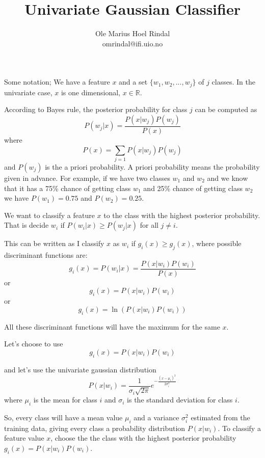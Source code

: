 \documentclass[11pt]{report}
\title{Univariate Gaussian Classifier}
\author{Ole Marius Hoel Rindal \\ omrindal@ifi.uio.no}
\begin{document}
\maketitle
Some notation; We have a feature $x$ and a set $\{w_1, w_2, ..., w_j\}$ of $j$ classes. In the univariate case, $x$ is one dimensional, $x \in \mathbb{R}$.

According to Bayes rule, the posterior probability for class $j$ can be computed as 
\begin{equation}
	P(w_j|x) = \frac{P(x|w_j)P(w_j)}{P(x)}
\end{equation}
where 
\begin{equation}
	P(x) = \sum_{j=1} P(x|w_j)P(w_j)
\end{equation}
and $P(w_j)$ is the a priori probability. A priori probability means the probability given in advance. For example, if we have two classes $w_1$ and $w_2$ and we know that it has a 75\% chance of getting class $w_1$ and 25\% chance of getting class $w_2$ we have $P(w_1) = 0.75$ and $P(w_2) = 0.25$.

We want to classify a feature $x$ to the class with the highest posterior probability. That is decide $w_i$ if $P(w_i|x) \geq P(w_j|x)$ for all $j \neq i$.

This can be written as I classify $x$ as $w_i$ if $g_i(x) \geq g_j(x)$, where possible discriminant functions are:
\begin{equation}
	g_i(x) = P(w_i|x) = \frac{P(x|w_i)P(w_i)}{P(x)}
\end{equation}
or
\begin{equation}
	g_i(x) = P(x|w_i)P(w_i)
\end{equation}
or
\begin{equation}
	g_i(x) = \ln(P(x|w_i)P(w_i))
\end{equation}

All these discriminant functions will have the maximum for the same $x$.

Let's choose to use
\begin{equation}
		g_i(x) = P(x|w_i)P(w_i)
\end{equation}

and let's use the univariate gaussian distribution
\begin{equation}
	P(x|w_i) = \frac{1}{\sigma_i\sqrt{2\pi}}e^{-\frac{(x - \mu_i)^2}{2\sigma_i^2}}
\end{equation}
where $\mu_i$ is the mean for class $i$ and $\sigma_i$ is the standard deviation for class $i$.

So, every class will have a mean value $\mu_i$ and a variance $\sigma_i^2$ estimated from the training data, giving every class a probability distribution $P(x|w_i)$. To classify a feature value $x$, choose the the class with the highest posterior probability $g_i(x) = P(x|w_i)P(w_i)$.
\end{document}
